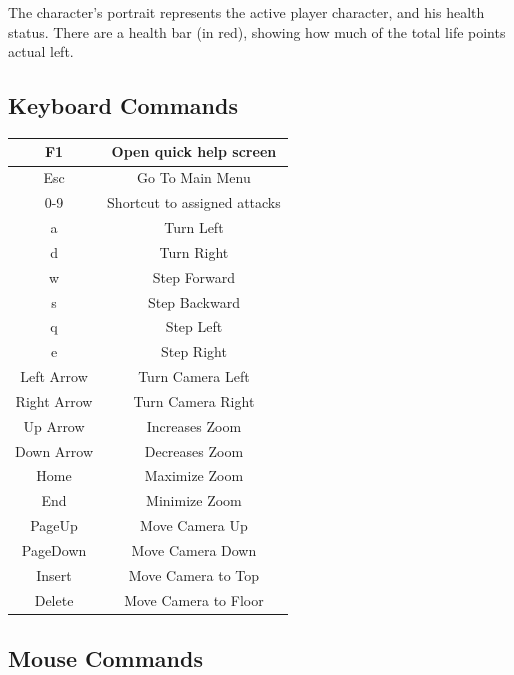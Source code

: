 \documentclass[ letterpaper,12pt]{article}
\begin{document}
The character's portrait represents the active player character, and his health status. There are a health bar (in red), showing how much of the total life points actual left.

\subsection{Keyboard Commands}

\begin{tabular}{|c|c|}
\hline
F1 & Open quick help screen\\
\hline
Esc & Go To Main Menu\\
\hline
0-9 & Shortcut to assigned attacks\\
\hline
a & Turn Left\\
d & Turn Right\\
w & Step Forward\\
s & Step Backward\\
q & Step Left\\
e & Step Right\\
\hline
Left Arrow & Turn Camera Left\\
Right Arrow & Turn Camera Right\\
Up Arrow & Increases Zoom\\
Down Arrow & Decreases Zoom\\
Home & Maximize Zoom\\
End & Minimize Zoom\\
PageUp & Move Camera Up\\
PageDown & Move Camera Down\\
Insert & Move Camera to Top\\
Delete & Move Camera to Floor\\
\hline
\end{tabular}

\subsection{Mouse Commands}
\end{document}
